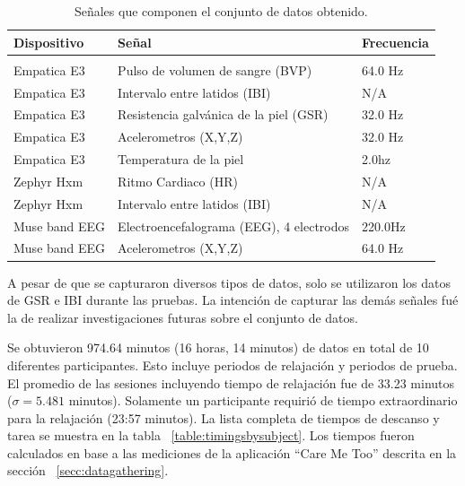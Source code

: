         \begin{table}[h!]
                \footnotesize
                \centering
                \caption{Se\~nales que componen el conjunto de datos obtenido.}
               \label{table:signalsperdevice}

	       \renewcommand{\arraystretch}{1.5}
                \begin{tabular}{m{3.5cm}m{5.5cm}m{2.5cm}}
                        \hline\noalign{\smallskip}

                \textbf{Dispositivo} & \textbf{Se\~nal} & \textbf{Frecuencia}\\
                \hline
                        \\ \noalign{\smallskip}
		Empatica E3&Pulso de volumen de sangre (BVP)&64.0 Hz\\
		Empatica E3&Intervalo entre latidos (IBI)&N/A\\
		Empatica E3&Resistencia galv\'anica de la piel (GSR)&32.0 Hz\\
		Empatica E3&Acelerometros (X,Y,Z)&32.0 Hz\\
		Empatica E3&Temperatura de la piel&2.0hz\\
		Zephyr Hxm&Ritmo Cardiaco (HR)&N/A\\
		Zephyr Hxm&Intervalo entre latidos (IBI)&N/A\\
		Muse band EEG&Electroencefalograma (EEG), 4 electrodos&220.0Hz\\
		Muse band EEG&Acelerometros (X,Y,Z)&64.0 Hz\\
        \end{tabular}
\end{table}

A pesar de que se capturaron diversos tipos de datos, solo se utilizaron los datos de GSR e IBI durante las pruebas. La intenci\'on de capturar las dem\'as se\~nales fu\'e la de realizar investigaciones futuras sobre el conjunto de datos.

Se obtuvieron 974.64 minutos (16 horas, 14 minutos) de datos en total de 10 diferentes participantes. Esto incluye periodos de relajaci\'on y periodos de prueba. El promedio de las sesiones incluyendo tiempo de relajaci\'on fue de 33.23 minutos ($\sigma= 5.481$ minutos). Solamente un participante requiri\'o de tiempo extraordinario para la relajaci\'on (23:57 minutos). La lista completa de tiempos de descanso y tarea se muestra en la tabla  ~\ref{table:timingsbysubject}. Los tiempos fueron calculados en base a las mediciones de la aplicaci\'on ``Care Me Too'' descrita en la secci\'on ~\ref{secc:datagathering}.

